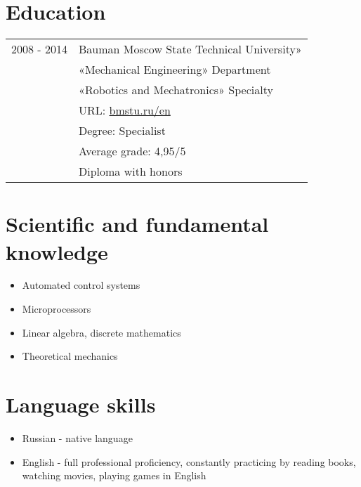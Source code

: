 \documentclass[a4paper, 11pt]{article}
\begin{document}
\section{Education}
\begin{tabular}{p{25mm}|p{110mm}}
2008 - 2014         & Bauman Moscow State Technical University»         \\
                    & «Mechanical Engineering» Department               \\
                    & «Robotics and Mechatronics» Specialty            \\
                    & URL: \href{http://www.bmstu.ru/en/}{bmstu.ru/en}  \\
                    & Degree: Specialist                                \\
                    & Average grade: 4,95/5                             \\
                    & Diploma with honors
\end{tabular}

\section{Scientific and fundamental knowledge}
\begin{itemize}
    \item Automated control systems
    \item Microprocessors
    \item Linear algebra, discrete mathematics
    \item Theoretical mechanics
\end{itemize}

\section{Language skills}
\begin{itemize}
    \item   Russian    - native language
    \item   English    - full professional proficiency, constantly practicing by
            reading books, watching movies, playing games in English
\end{itemize}
\end{document}
